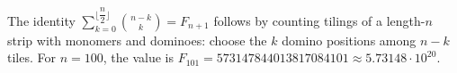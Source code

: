 The identity $\sum_{k=0}^{\lfloor \dfrac{n}{2}\rfloor}\binom{n-k}k=F_{n+1}$ follows by counting tilings of a length-$n$ strip with monomers and dominoes: choose the $k$ domino positions among $n-k$ tiles. For $n=100$, the value is $F_{101}=573147844013817084101\approx\boxed{5.73148\cdot10^{20}}$.
